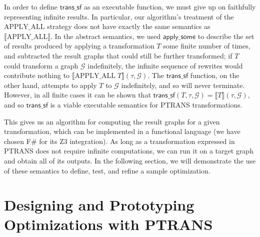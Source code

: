\documentclass{eptcs}
\newcommand{\ptrans}[0]{PTRANS}
\newcommand{\transsf}[3]{\llbracket #1 \rrbracket(#2,#3)}
\newcommand{\transsfe}[3]{\mathsf{trans\_sf}(#1, #2, #3)}
\begin{document}
In order to define $\mathsf{trans\_sf}$ as an executable function, we must give up on faithfully representing infinite results. In particular, our algorithm's treatment of the $\mathrm{APPLY\_ALL}$ strategy does not have exactly the same semantics as $\llbracket\mathrm{APPLY\_ALL}\rrbracket$. In the abstract semantics, we used $\mathsf{apply\_some}$ to describe the set of results produced by applying a transformation $T$ some finite number of times, and subtracted the result graphs that could still be further transformed; if $T$ could transform a graph $\mathcal{G}$ indefinitely, the infinite sequence of rewrites would contribute nothing to $\transsf{\mathrm{APPLY\_ALL}\;T}{\tau}{\mathcal{G}}$. The $\mathsf{trans\_sf}$ function, on the other hand, attempts to apply $T$ to $\mathcal{G}$ indefinitely, and so will never terminate. However, in all finite cases it can be shown that $\transsfe{T}{\tau}{\mathcal{G}} = \transsf{T}{\tau}{\mathcal{G}}$, and so $\mathsf{trans\_sf}$ is a viable executable semantics for {\ptrans} transformations.

This gives us an algorithm for computing the result graphs for a given transformation, which can be implemented in a functional language (we have chosen F\# for its Z3 integration). As long as a transformation expressed in {\ptrans} does not require infinite computations, we can run it on a target graph and obtain all of its outputs. In the following section, we will demonstrate the use of these semantics to define, test, and refine a sample optimization.

\section{Designing and Prototyping Optimizations with {\ptrans}}
\end{document}
